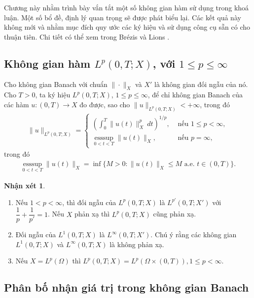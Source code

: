 \documentclass[12pt,a4paper]{article}
\DeclareMathOperator{\esssup}{esssup}
\theoremstyle{definition}
\newtheorem{remark}[definition]{Nhận xét}[section]
\theoremstyle{definition}
\begin{document}
Chương này nhằm trình bày vắn tắt một số không gian hàm sử dụng trong khoá luận. Một số bổ đề, định lý quan trọng sẽ được phát biểu lại. Các kết quả này không mới và nhằm mục đích quy ước các ký hiệu và sử dụng công cụ sẵn có cho thuận tiên. Chi tiết có thể xem trong Brézis \cite{Bre} và Lions \cite{Lions}.

\subsection{Không gian hàm $L^p(0, T; X)$, với $1 \le p \le \infty$}

Cho không gian Banach với chuẩn $\|\cdot\|_X$ và $X'$ là không gian đối ngẫu của nó. Cho $T > 0$, ta ký hiệu $L^p(0,T;X)$, $1 \le p \le \infty$, để chỉ không gian Banach của các hàm $u:(0,T) \rightarrow X$ đo được, sao cho $\|u\|_{L^p(0,T;X)} < +\infty$, trong đó
\begin{align*}
    \|u\|_{L^p(0,T;X)} = \begin{cases}
        \displaystyle\left(\int_0^T \|u(t)\|_X^p \: dt\right)^{1/p}, &\text{ nếu } 1 \le p < \infty, \\
        \underset{0 < t < T}{\esssup} \|u(t)\|_X, &\text{ nếu } p = \infty,
    \end{cases}
\end{align*}
trong đó
\begin{align*}
    \underset{0 < t < T}{\esssup} \|u(t)\|_X = \inf \{ M > 0 : \|u(t)\|_X \le M \text{ a.e. } t \in (0,T) \}.
\end{align*}

\begin{remark}\end{remark}
\begin{enumerate}
    \item Nếu $1 < p < \infty$, thì đối ngẫu của $L^p(0,T;X)$ là $L^{p'}(0,T;X')$ với $\dfrac{1}{p} + \dfrac{1}{p'} = 1$. Nếu $X$ phản xạ thì $L^p(0,T;X)$ cũng phản xạ.
    \item Đối ngẫu của $L^1(0,T;X)$ là $L^\infty(0,T;X')$. Chú ý rằng các không gian $L^1(0,T;X)$ và $L^\infty(0,T;X)$ là không phản xạ.
    \item Nếu $X = L^p(\Omega)$ thì $L^p(0,T;X) = L^p(\Omega \times (0,T)), 1 \le p < \infty$.
\end{enumerate}

\subsection{Phân bố nhận giá trị trong không gian Banach}
\end{document}
